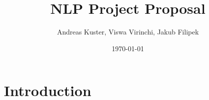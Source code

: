 \documentclass{article}
\title{NLP Project Proposal}
\author{Andreas Kuster, Viswa Virinchi, Jakub Filipek}
\date{\today}
\begin{document}
\maketitle

\section{Introduction}
\end{document}
